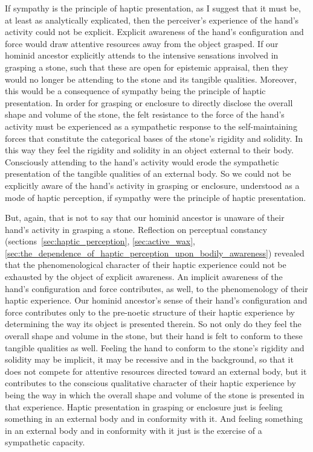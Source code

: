 If sympathy is the principle of haptic presentation, as I suggest that it must be, at least as analytically explicated, then the perceiver's experience of the hand's activity could not be explicit. Explicit awareness of the hand's configuration and force would draw attentive resources away from the object grasped. If our hominid ancestor explicitly attends to the intensive sensations involved in grasping a stone, such that these are open for epistemic appraisal, then they would no longer be attending to the stone and its tangible qualities. Moreover, this would be a consequence of sympathy being the principle of haptic presentation. In order for grasping or enclosure to directly disclose the overall shape and volume of the stone, the felt resistance to the force of the hand's activity must be experienced as a sympathetic response to the self-maintaining forces that constitute the categorical bases of the stone's rigidity and solidity. In this way they feel the rigidity and solidity in an object external to their body. Consciously attending to the hand's activity would erode the sympathetic presentation of the tangible qualities of an external body. So we could not be explicitly aware of the hand's activity in grasping or enclosure, understood as a mode of haptic perception, if sympathy were the principle of haptic presentation.

But, again, that is not to say that our hominid ancestor is unaware of their hand's activity in grasping a stone. Reflection on perceptual constancy (sections~\ref{sec:haptic_perception}, \ref{sec:active_wax}, \ref{sec:the_dependence_of_haptic_perception_upon_bodily_awareness}) revealed that the phenomenological character of their haptic experience could not be exhausted by the object of explicit awareness. An implicit awareness of the hand's configuration and force contributes, as well, to the phenomenology of their haptic experience. Our hominid ancestor's sense of their hand’s configuration and force contributes only to the pre-noetic structure of their haptic experience by determining the way its object is presented therein. So not only do they feel the overall shape and volume in the stone, but their hand is felt to conform to these tangible qualities as well. Feeling the hand to conform to the stone's rigidity and solidity may be implicit, it may be recessive and in the background, so that it does not compete for attentive resources directed toward an external body, but it contributes to the conscious qualitative character of their haptic experience by being the way in which the overall shape and volume of the stone is presented in that experience. Haptic presentation in grasping or enclosure just is feeling something in an external body and in conformity with it. And feeling something in an external body and in conformity with it just is the exercise of a sympathetic capacity.

